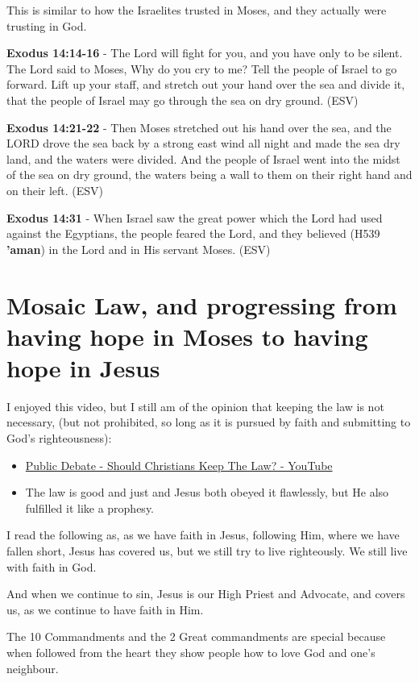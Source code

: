 \documentclass[11pt]{article}
\begin{document}
This is similar to how the Israelites trusted in Moses, and they actually were trusting in God.

\textbf{Exodus 14:14-16} - The Lord will fight for you, and you have only to be silent.  The Lord said to Moses, Why do you cry to me? Tell the people of Israel to go forward.  Lift up your staff, and stretch out your hand over the sea and divide it, that the people of Israel may go through the sea on dry ground. (ESV)

\textbf{Exodus 14:21-22} - Then Moses stretched out his hand over the sea, and the LORD drove the sea back by a strong east wind all night and made the sea dry land, and the waters were divided. And the people of Israel went into the midst of the sea on dry ground, the waters being a wall to them on their right hand and on their left. (ESV)

\textbf{Exodus 14:31} - When Israel saw the great power which the Lord had used against the Egyptians, the people feared the Lord, and they believed (H539 \textbf{'aman}) in the Lord and in His servant Moses. (ESV)

\section{Mosaic Law, and progressing from having hope in Moses to having hope in Jesus}
\label{sec:orgf15d066}
I enjoyed this video, but I still am of the opinion that keeping the law is not necessary, (but not prohibited, so long as it is pursued by faith and submitting to God's righteousness):
\begin{itemize}
\item \href{https://www.youtube.com/watch?v=CNHKqhwu6Bo}{Public Debate - Should Christians Keep The Law? - YouTube}
\item The law is good and just and Jesus both obeyed it flawlessly, but He also fulfilled it like a prophesy.
\end{itemize}

I read the following as, as we have faith in Jesus, following Him, where we have fallen short, Jesus has covered us, but we still try to live righteously. We still live with faith in God.

And when we continue to sin, Jesus is our High Priest and Advocate, and covers us, as we continue to have faith in Him.

The 10 Commandments and the 2 Great commandments are special because when followed from the heart they show people how to love God and one's neighbour.
\end{document}
